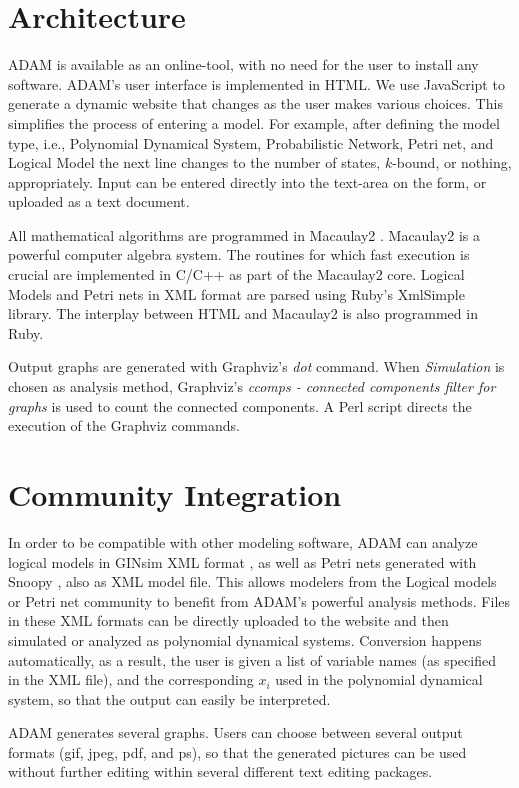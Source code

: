 \documentclass[11pt]{amsart}
\begin{document}
\section{Architecture}
ADAM is available as an online-tool, with no need for the user to install any software. ADAM's user interface is implemented in HTML. We use JavaScript to generate a dynamic website that changes as the user makes various choices. This simplifies the process of entering a model. For example, after defining the model type, i.e., Polynomial Dynamical System, Probabilistic Network, Petri net, and Logical Model the next line changes to the number of states, $k$-bound, or nothing, appropriately. Input can be entered directly into the text-area on the form, or uploaded as a text document.
 
All mathematical algorithms are programmed in Macaulay2 \cite{M2}. Macaulay2 is a powerful computer algebra system. The routines for which fast execution is crucial are implemented in C/C++ as part of the Macaulay2 core. Logical Models and Petri nets in XML format are parsed using Ruby's XmlSimple library. The interplay between HTML and Macaulay2 is also programmed in Ruby.
 
Output graphs are generated with Graphviz's {\it dot} command. When {\it Simulation} is chosen as analysis method, Graphviz's {\it ccomps - connected components filter for graphs} is used to count the connected components. A Perl script directs the execution of the Graphviz commands.
\section{Community Integration}
In order to be compatible with other modeling software, ADAM can analyze logical models in GINsim XML format \cite{GINsim}, as well as Petri nets generated with Snoopy \cite{Snoopy}, also as XML model file. This allows modelers from the Logical models or Petri net community to benefit from ADAM's powerful analysis methods. Files in these XML formats can be directly uploaded to the website and then simulated or analyzed as polynomial dynamical systems. Conversion happens automatically, as a result, the user is given a list of variable names (as specified in the XML file), and the corresponding $x_i$ used in the polynomial dynamical system, so that the output can easily be interpreted.
 
ADAM generates several graphs. Users can choose between several output formats (gif, jpeg, pdf, and ps), so that the generated pictures can be used without further editing within several different text editing packages.
 
\end{document}

